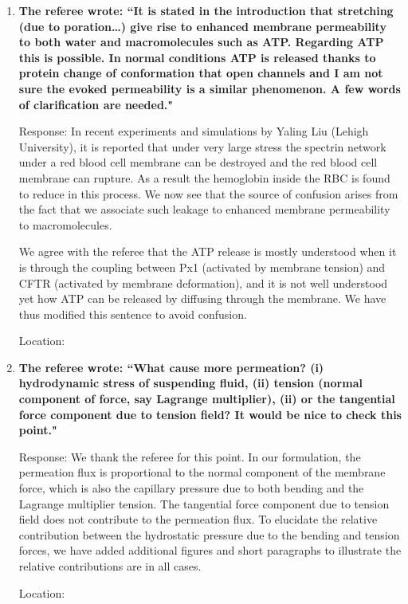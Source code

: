 \documentclass[12pt]{article}
\begin{document}
\begin{enumerate}
\item {\bf 
The referee wrote:
``It is stated in the introduction that stretching (due to poration…)
    give rise to enhanced membrane permeability to both water and
    macromolecules such as ATP. Regarding ATP this is possible. In
    normal conditions ATP is released thanks to protein change of
    conformation that open channels and I am not sure the evoked
    permeability is a similar phenomenon. A few words of clarification
    are needed."}

\noindent
Response: In recent experiments and simulations by Yaling Liu (Lehigh University), it is reported that under very large stress the spectrin network under a red blood cell membrane can be destroyed and the red blood cell membrane can rupture. As a result the hemoglobin inside the RBC is found to reduce in this process. We now see that the source of confusion arises from the fact that we associate such leakage to enhanced membrane permeability to macromolecules. 

We agree with the referee that the ATP release is mostly understood when
it is through the coupling between Px1 (activated by membrane tension)
and CFTR (activated by membrane deformation), and it is not well
understood yet how ATP can be released by diffusing through the membrane. We have thus modified this sentence to avoid confusion.

\noindent
Location: 

\item {\bf
The referee wrote:
``What cause more permeation? (i) hydrodynamic stress of suspending
fluid, (ii) tension (normal component of force, say Lagrange
multiplier), (ii) or the tangential force component due to tension
field? It would be nice to check this point."}

\noindent
Response: We thank the referee for this point. In our formulation, the
    permeation flux is proportional to the normal component of the
    membrane force, which is also the capillary pressure due to both
    bending and the Lagrange multiplier tension. The tangential
    force component due to tension field does not contribute to the
    permeation flux. To elucidate the relative contribution between the
    hydrostatic pressure due to the bending and tension forces, we have
    added additional figures and short paragraphs to illustrate the
    relative contributions are in all cases.

\noindent
Location:



\end{enumerate}
\end{document}
